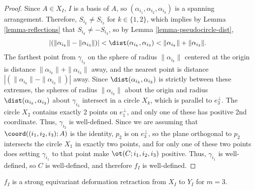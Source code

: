 \begin{proof}
Since $A \in X_I$, $I$ is a basis of $A$, so $(\alpha_{i_1},\alpha_{i_2},\alpha_{i_3})$ is a spanning arrangement. Therefore, $S_{i_k} \neq S_{i_3}$ for $k \in \{1,2\}$, which implies by Lemma \ref{lemma-reflections} that $S_{i_k} \neq -S_{i_3}$, so by Lemma \ref{lemma-pseudocircle-dist},
\[ |(\|\alpha_{i_k}\| - \|\alpha_{i_3}\|)| < \dist(\alpha_{i_k},\alpha_{i_3}) < \|\alpha_{i_k}\| +\|\alpha_{i_3}\|. \]
The farthest point from $\gamma_{i_3}$ on the sphere of radius $\|\alpha_{i_k}\|$ centered at the origin is distance $\|\alpha_{i_k}\| +\|\alpha_{i_3}\|$ away, and the nearest point is distance $|(\|\alpha_{i_k}\| - \|\alpha_{i_3}\|)|$ away. Since $\dist(\alpha_{i_k},\alpha_{i_3})$ is strictly between these extremes, the spheres of radius $\|\alpha_{i_k}\|$ about the origin and radius $\dist(\alpha_{i_k},\alpha_{i_3})$ about $\gamma_{i_3}$ intersect in a circle $X_k$, which is parallel to $e_3^\bot$.
The circle $X_2$ contains exactly 2 points on $e_1^\bot$, and only one of these has positive 2nd coordinate.
Thus, $\gamma_{i_2}$ is well-defined.
Since we are assuming that $\coord((i_1,i_2,i_3);A)$ is the identity,
$p_2$ is on $e_3^\bot$, so the plane orthogonal to $p_2$ intersects the circle $X_1$ in exactly two points, and for only one of these two points does setting $\gamma_{i_1}$ to that point make $\ot(C;i_1,i_2,i_3)$ positive.
Thus, $\gamma_{i_1}$ is well-defined, so $C$ is well-defined, and therefore $f_I$ is well-defined.
\end{proof}

\begin{claim}\label{claim-deform-f3}
$f_I$ is a strong equivariant deformation retraction from $X_I$ to $Y_I$ for $m=3$.
\end{claim}

